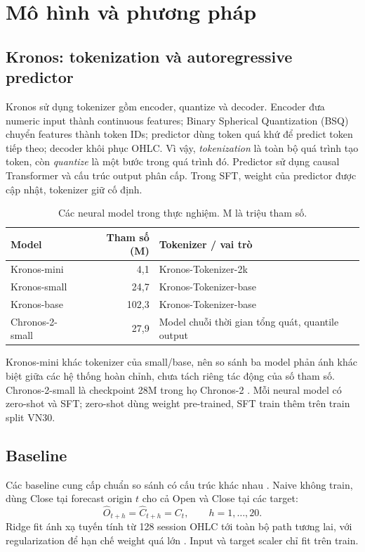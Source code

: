 \documentclass[11pt,a4paper]{article}
\begin{document}
\section{Mô hình và phương pháp}
\subsection{Kronos: tokenization và autoregressive predictor}
Kronos sử dụng tokenizer gồm encoder, quantize và decoder. Encoder đưa
numeric input thành continuous features; Binary Spherical Quantization
(BSQ) chuyển features thành token IDs; predictor dùng token quá khứ để
predict token tiếp theo; decoder khôi phục OHLC. Vì vậy, \emph{tokenization}
là toàn bộ quá trình tạo token, còn \emph{quantize} là một bước trong quá
trình đó. Predictor sử dụng causal Transformer và cấu trúc output phân
cấp. Trong SFT, weight của predictor được cập nhật, tokenizer giữ cố định.

\begin{table}[htbp]
\centering\small
\caption{Các neural model trong thực nghiệm. M là triệu tham số.}
\label{tab:models}
\begin{tabularx}{\linewidth}{@{}l r X@{}}
\toprule
Model & Tham số (M) & Tokenizer / vai trò\\
\midrule
Kronos-mini & 4,1 & Kronos-Tokenizer-2k\\
Kronos-small & 24,7 & Kronos-Tokenizer-base\\
Kronos-base & 102,3 & Kronos-Tokenizer-base\\
Chronos-2-small & 27,9 & Model chuỗi thời gian tổng quát, quantile output\\
\bottomrule
\end{tabularx}
\end{table}

Kronos-mini khác tokenizer của small/base, nên so sánh ba model phản ánh
khác biệt giữa các hệ thống hoàn chỉnh, chưa tách riêng tác động của số
tham số. Chronos-2-small là checkpoint 28M trong họ Chronos-2
\citep{chronossmall}. Mỗi neural model có zero-shot và SFT; zero-shot dùng
weight pre-trained, SFT train thêm trên train split VN30.

\subsection{Baseline}
Các baseline cung cấp chuẩn so sánh có cấu trúc khác nhau
\citep{hyndmanfpp3}. Naive không train, dùng Close tại forecast origin $t$
cho cả Open và Close tại các target:
\begin{equation}
 \widehat{O}_{t+h}= \widehat{C}_{t+h}=C_t,\qquad h=1,\ldots,20.
\end{equation}
Ridge fit ánh xạ tuyến tính từ 128 session OHLC tới toàn bộ path tương lai,
với regularization để hạn chế weight quá lớn \citep{hoerl1970ridge}.
Input và target scaler chỉ fit trên train.
\end{document}

